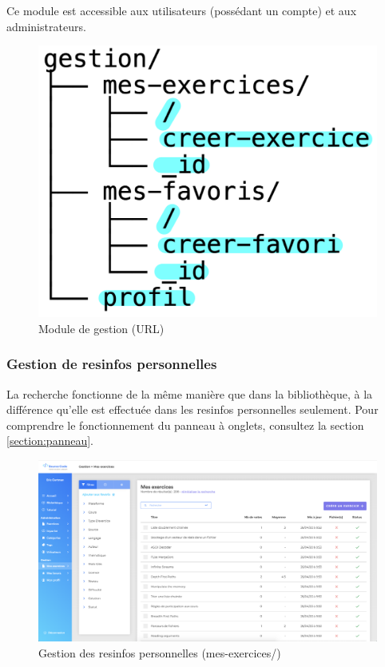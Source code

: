 Ce module est accessible aux utilisateurs (possédant un compte) et aux administrateurs.

\begin{figure}[H]
    \includegraphics[width=\textwidth,height=0.2\textheight,keepaspectratio]{images/client/gestion.jpeg}
    \centering
    \caption[SourceCode : module de gestion (URL)]{Module de gestion (URL)}
\end{figure}

\subsubsection{Gestion de \glspl{resinfo} personnelles}
\label{section:gestionResInfo}

La recherche fonctionne de la même manière que dans la bibliothèque, à la différence qu'elle est effectuée dans les \glspl{resinfo} personnelles seulement. Pour comprendre le fonctionnement du panneau à onglets, consultez la section \ref{section:panneau}.

\begin{figure}[H]
    \includegraphics[width=\textwidth,height=\textheight,keepaspectratio]{images/client/gestion-exercices.png}
    \centering
    \caption[SourceCode : gestion des \glspl{resinfo} personnelles]{Gestion des \glspl{resinfo} personnelles (mes-exercices/)}
\end{figure}

